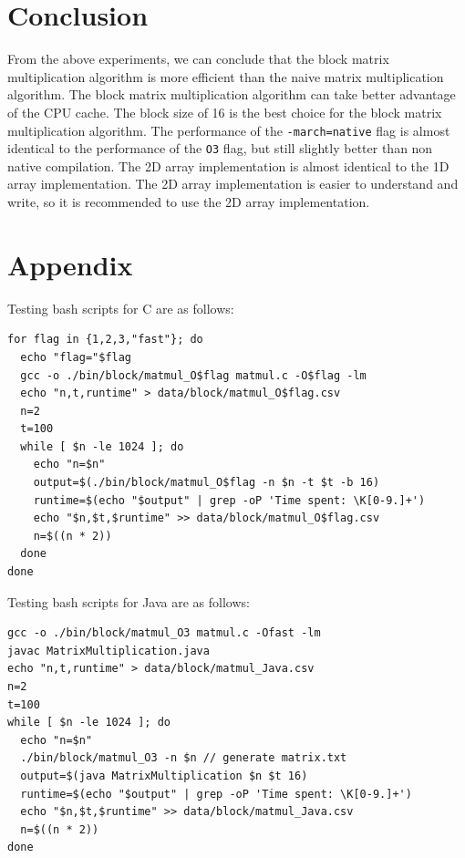 \documentclass{article}
\begin{document}
\section{Conclusion}
From the above experiments, we can conclude that the block matrix multiplication algorithm is more efficient than the naive matrix multiplication algorithm. The block matrix multiplication algorithm can take better advantage of the CPU cache. The block size of 16 is the best choice for the block matrix multiplication algorithm. The performance of the \texttt{-march=native} flag is almost identical to the performance of the \texttt{O3} flag, but still slightly better than non native compilation. The 2D array implementation is almost identical to the 1D array implementation. The 2D array implementation is easier to understand and write, so it is recommended to use the 2D array implementation. 

\section{Appendix}
Testing bash scripts for C are as follows:
\begin{verbatim}
for flag in {1,2,3,"fast"}; do
  echo "flag="$flag
  gcc -o ./bin/block/matmul_O$flag matmul.c -O$flag -lm
  echo "n,t,runtime" > data/block/matmul_O$flag.csv
  n=2
  t=100
  while [ $n -le 1024 ]; do
    echo "n=$n"
    output=$(./bin/block/matmul_O$flag -n $n -t $t -b 16)
    runtime=$(echo "$output" | grep -oP 'Time spent: \K[0-9.]+')
    echo "$n,$t,$runtime" >> data/block/matmul_O$flag.csv
    n=$((n * 2))
  done
done
\end{verbatim}

Testing bash scripts for Java are as follows:
\begin{verbatim}
gcc -o ./bin/block/matmul_O3 matmul.c -Ofast -lm
javac MatrixMultiplication.java
echo "n,t,runtime" > data/block/matmul_Java.csv
n=2
t=100
while [ $n -le 1024 ]; do
  echo "n=$n"
  ./bin/block/matmul_O3 -n $n // generate matrix.txt
  output=$(java MatrixMultiplication $n $t 16)
  runtime=$(echo "$output" | grep -oP 'Time spent: \K[0-9.]+')
  echo "$n,$t,$runtime" >> data/block/matmul_Java.csv
  n=$((n * 2))
done
\end{verbatim}
\end{document}
